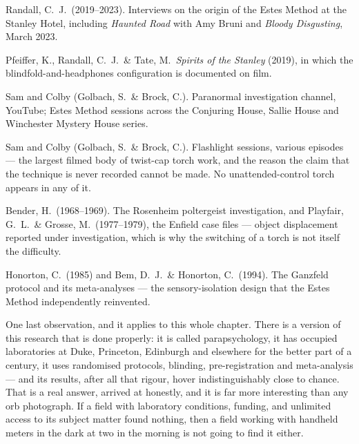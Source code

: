 \begin{srcnotes}
\item Randall, C.\ J.\ (2019--2023). Interviews on the origin of the Estes Method at the Stanley
Hotel, including \emph{Haunted Road} with Amy Bruni and \emph{Bloody Disgusting}, March 2023.
\item Pfeiffer, K., Randall, C.\ J.\ \& Tate, M.\ \emph{Spirits of the Stanley} (2019), in which
the blindfold-and-headphones configuration is documented on film.
\item Sam and Colby (Golbach, S.\ \& Brock, C.). Paranormal investigation channel, YouTube; Estes
Method sessions across the Conjuring House, Sallie House and Winchester Mystery House series.
\item Sam and Colby (Golbach, S.\ \& Brock, C.). Flashlight sessions, various episodes --- the
largest filmed body of twist-cap torch work, and the reason the claim that the technique is
never recorded cannot be made. No unattended-control torch appears in any of it.
\item Bender, H.\ (1968--1969). The Rosenheim poltergeist investigation, and Playfair, G.\ L.\ \&
Grosse, M.\ (1977--1979), the Enfield case files --- object displacement reported under
investigation, which is why the switching of a torch is not itself the difficulty.
\item Honorton, C.\ (1985) and Bem, D.\ J.\ \& Honorton, C.\ (1994). The Ganzfeld protocol and
its meta-analyses --- the sensory-isolation design that the Estes Method independently
reinvented.
\end{srcnotes}

One last observation, and it applies to this whole chapter. There is a version of this research
that is done properly: it is called parapsychology, it has occupied laboratories at Duke,
Princeton, Edinburgh and elsewhere for the better part of a century, it uses randomised
protocols, blinding, pre-registration and meta-analysis --- and its results, after all that
rigour, hover indistinguishably close to chance. That is a real answer, arrived at honestly, and
it is far more interesting than any orb photograph. If a field with laboratory conditions,
funding, and unlimited access to its subject matter found nothing, then a field working with
handheld meters in the dark at two in the morning is not going to find it either.
